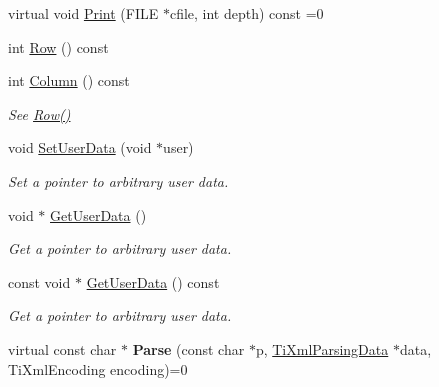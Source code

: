 \begin{DoxyCompactItemize}
\item 
virtual void \hyperlink{class_ti_xml_base_a0de56b3f2ef14c65091a3b916437b512}{Print} (F\+I\+L\+E $\ast$cfile, int depth) const =0
\item 
int \hyperlink{class_ti_xml_base_a024bceb070188df92c2a8d8852dd0853}{Row} () const 
\item 
\hypertarget{class_ti_xml_base_ab54bfb9b70fe6dd276e7b279cab7f003}{int \hyperlink{class_ti_xml_base_ab54bfb9b70fe6dd276e7b279cab7f003}{Column} () const }\label{class_ti_xml_base_ab54bfb9b70fe6dd276e7b279cab7f003}

\begin{DoxyCompactList}\small\item\em See \hyperlink{class_ti_xml_base_a024bceb070188df92c2a8d8852dd0853}{Row()} \end{DoxyCompactList}\item 
\hypertarget{class_ti_xml_base_ac6b3e0f790930d4970ec30764e937b5d}{void \hyperlink{class_ti_xml_base_ac6b3e0f790930d4970ec30764e937b5d}{Set\+User\+Data} (void $\ast$user)}\label{class_ti_xml_base_ac6b3e0f790930d4970ec30764e937b5d}

\begin{DoxyCompactList}\small\item\em Set a pointer to arbitrary user data. \end{DoxyCompactList}\item 
\hypertarget{class_ti_xml_base_a6559a530ca6763fc301a14d77ed28c17}{void $\ast$ \hyperlink{class_ti_xml_base_a6559a530ca6763fc301a14d77ed28c17}{Get\+User\+Data} ()}\label{class_ti_xml_base_a6559a530ca6763fc301a14d77ed28c17}

\begin{DoxyCompactList}\small\item\em Get a pointer to arbitrary user data. \end{DoxyCompactList}\item 
\hypertarget{class_ti_xml_base_ad0120210e4680ef2088601753ce0ede4}{const void $\ast$ \hyperlink{class_ti_xml_base_ad0120210e4680ef2088601753ce0ede4}{Get\+User\+Data} () const }\label{class_ti_xml_base_ad0120210e4680ef2088601753ce0ede4}

\begin{DoxyCompactList}\small\item\em Get a pointer to arbitrary user data. \end{DoxyCompactList}\item 
\hypertarget{class_ti_xml_base_a00e4edb0219d00a1379c856e5a1d2025}{virtual const char $\ast$ {\bfseries Parse} (const char $\ast$p, \hyperlink{class_ti_xml_parsing_data}{Ti\+Xml\+Parsing\+Data} $\ast$data, Ti\+Xml\+Encoding encoding)=0}\label{class_ti_xml_base_a00e4edb0219d00a1379c856e5a1d2025}

\end{DoxyCompactItemize}
